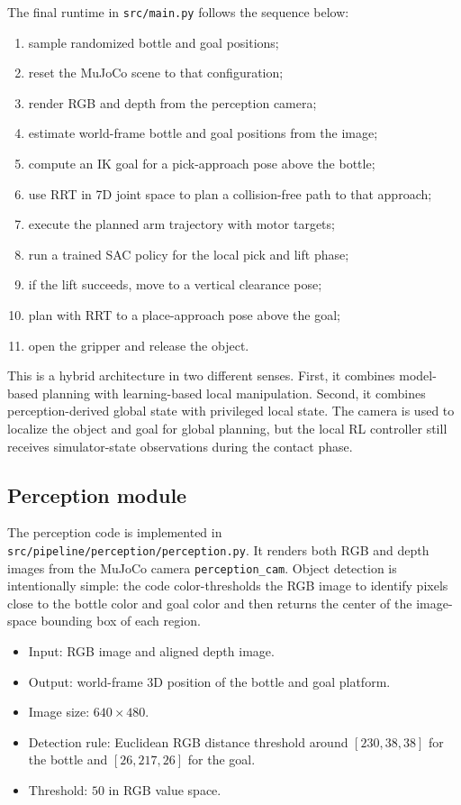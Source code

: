 \documentclass[11pt]{article}
\begin{document}
The final runtime in \texttt{src/main.py} follows the sequence below:
\begin{enumerate}[leftmargin=*]
    \item sample randomized bottle and goal positions;
    \item reset the MuJoCo scene to that configuration;
    \item render RGB and depth from the perception camera;
    \item estimate world-frame bottle and goal positions from the image;
    \item compute an IK goal for a pick-approach pose above the bottle;
    \item use RRT in 7D joint space to plan a collision-free path to that approach;
    \item execute the planned arm trajectory with motor targets;
    \item run a trained SAC policy for the local pick and lift phase;
    \item if the lift succeeds, move to a vertical clearance pose;
    \item plan with RRT to a place-approach pose above the goal;
    \item open the gripper and release the object.
\end{enumerate}

This is a hybrid architecture in two different senses. First, it combines model-based planning with learning-based local manipulation. Second, it combines perception-derived global state with privileged local state. The camera is used to localize the object and goal for global planning, but the local RL controller still receives simulator-state observations during the contact phase.

\subsection{Perception module}

The perception code is implemented in \texttt{src/pipeline/perception/perception.py}. It renders both RGB and depth images from the MuJoCo camera \texttt{perception\_cam}. Object detection is intentionally simple: the code color-thresholds the RGB image to identify pixels close to the bottle color and goal color and then returns the center of the image-space bounding box of each region.

\begin{itemize}[leftmargin=*]
    \item Input: RGB image and aligned depth image.
    \item Output: world-frame 3D position of the bottle and goal platform.
    \item Image size: \(640 \times 480\).
    \item Detection rule: Euclidean RGB distance threshold around \([230, 38, 38]\) for the bottle and \([26, 217, 26]\) for the goal.
    \item Threshold: \(50\) in RGB value space.
\end{itemize}
\end{document}
